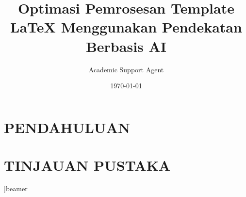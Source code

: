 \documentclass{beamer}
\title{Optimasi Pemrosesan Template LaTeX Menggunakan Pendekatan Berbasis AI}
\author{Academic Support Agent}
\date{\today}
\begin{document}
\maketitle

\begin{abstract}

\end{abstract}

\chapter{PENDAHULUAN}


\chapter{TINJAUAN PUSTAKA}


]{beamer}

\usepackage[english]{babel}
\usepackage[utf8]{inputenc}
\usepackage[T1]{fontenc}
\usepackage{csquotes}
\usepackage{expl3,biblatex}

\usepackage{booktabs}
\end{document}

